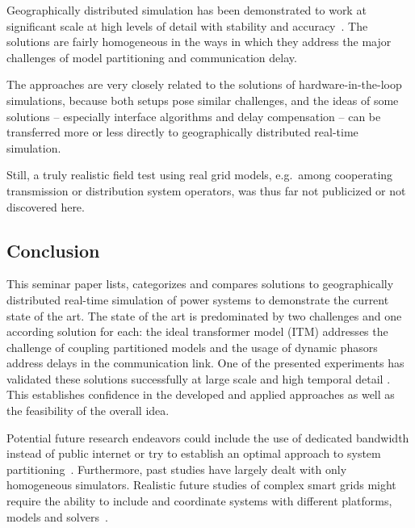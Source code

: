\documentclass[a4paper]{atseminar}
\begin{document}
Geographically distributed simulation has been demonstrated to work at significant scale at high levels of detail with stability and accuracy~\cite{monti2018}. The solutions are fairly homogeneous in the ways in which they address the major challenges of model partitioning and communication delay.

The approaches are very closely related to the solutions of hardware-in-the-loop simulations, because both setups pose similar challenges, and the ideas of some solutions -- especially interface algorithms and delay compensation -- can be transferred more or less directly to geographically distributed real-time simulation.

Still, a truly realistic field test using real grid models, e.g.~among cooperating transmission or distribution system operators, was thus far not publicized or not discovered here.


\subsection{Conclusion}


This seminar paper lists, categorizes and compares solutions to geographically distributed real-time simulation of power systems to demonstrate the current state of the art. 
The state of the art is predominated by two challenges and one according solution for each: the ideal transformer model (ITM) addresses the challenge of coupling partitioned models and the usage of dynamic phasors address delays in the communication link. One of the presented experiments has validated these solutions successfully at large scale and high temporal detail \cite{monti2018}. This establishes confidence in the developed and applied approaches as well as the feasibility of the overall idea.

Potential future research endeavors could include the use of dedicated bandwidth instead of public internet or try to establish an optimal approach to system partitioning~\cite{montoya2020}. Furthermore, past studies have largely dealt with only homogeneous simulators. Realistic future studies of complex smart grids might require the ability to include and coordinate systems with different platforms, models and solvers~\cite{syed2020standard, palensky2017}.



%
\printbibliography


\end{document}
